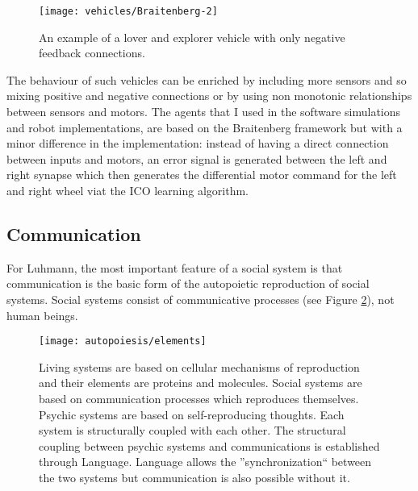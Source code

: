 \begin{figure}[htbp]
\begin{center}
\texttt{[image: vehicles/Braitenberg-2]}
\end{center}
\small{
\caption[Braitenberg vehicles negative feedback]{
An example of a lover and explorer vehicle with only negative feedback connections.
\label{Fig:Braitenberg:Example2}}}
\end{figure}

The behaviour of such vehicles can be enriched by including more sensors and so
 mixing positive and negative connections or by using non monotonic relationships
 between sensors and motors.
The agents that I used in the software simulations and robot implementations, 
are based on the Braitenberg framework but with a minor difference in the implementation:
instead of having a direct connection between inputs and motors, an error signal
is generated between the left and right synapse which then generates the differential
motor command for the left and right wheel viat the ICO learning algorithm.
 
\subsection{Communication}
For Luhmann, the most important feature of a social system is that communication
is the basic form of the autopoietic reproduction of social systems.
Social systems consist of communicative processes (see Figure
\ref{Fig:Autopoiesis:Communication}), not human beings.

\begin{figure}[htbp]
\begin{center}
\texttt{[image: autopoiesis/elements]}
\end{center}
\small{
\caption[Communication is the basis for society]{Living systems are based
on cellular mechanisms of reproduction and
their elements are proteins and molecules. Social systems are based on communication
processes which reproduces themselves. Psychic systems are based on self-reproducing
thoughts. Each system is structurally coupled with each other.
The structural coupling between psychic systems and communications is established
through Language. Language allows the ''synchronization`` between the two systems
but communication is also possible without it.
\label{Fig:Autopoiesis:Communication}}}
\end{figure}


